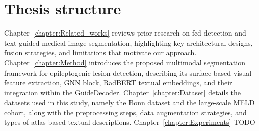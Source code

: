\documentclass[FCD_GNN.tex]{subfiles}
\begin{document}
\section{Thesis structure}
Chapter~\ref{chapter:Related_works} reviews prior research on \acs{fcd} detection and text-guided medical image segmentation, highlighting key architectural designs, fusion strategies, and limitations that motivate our approach. 
Chapter~\ref{chapter:Method} introduces the proposed multimodal segmentation framework for epileptogenic lesion detection, describing its surface-based visual feature extraction, GNN block, RadBERT textual embeddings, and their integration within the GuideDecoder. 
Chapter~\ref{chapter:Dataset} details the datasets used in this study, namely the Bonn dataset and the large-scale MELD cohort, along with the preprocessing steps, data augmentation strategies, and types of atlas-based textual descriptions. 
Chapter~\ref{chapter:Experiments} TODO
\end{document}
